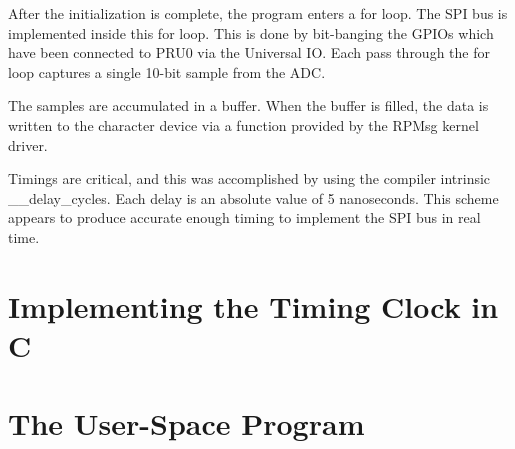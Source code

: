 After the initialization is complete, the program enters a for loop.  The SPI bus is implemented inside this for loop.  This is done by bit-banging the GPIOs which have been connected to PRU0 via the Universal IO.  Each pass through the for loop captures a single 10-bit sample from the ADC.

The samples are accumulated in a buffer.  When the buffer is filled, the data is written to the character device via a function provided by the RPMsg kernel driver.

Timings are critical, and this was accomplished by using the compiler intrinsic \_\_delay\_cycles.  Each delay is an absolute value of 5 nanoseconds.  This scheme appears to produce accurate enough timing to implement the SPI bus in real time.  

\section{Implementing the Timing Clock in C}

\section{The User-Space Program}

